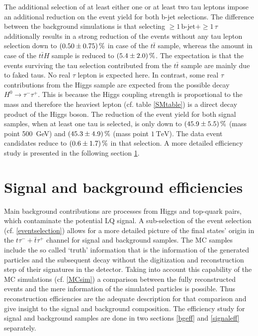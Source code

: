 %
The additional selection of at least either one or at least two tau leptons impose an additional reduction on the event yield for both b-jet selections. The difference between the background simulations is that selecting $\geq 1\,\text{b-jet}+\geq 1\,\tau$ additionally results in a strong reduction of the events without any tau lepton selection down to $\SI{0.5\pm 0.75}{\percent}$ in case of the $t\bar{t}$ sample, whereas the amount in case of the $t\bar{t}H$ sample is reduced to $\SI{5.4\pm 2.0}{\percent}$. The expectation is that the events surviving the tau selection contributed from the $t\bar{t}$ sample are mainly due to faked taus. No real $\tau$ lepton is expected here. In contrast, some real $\tau$ contributions from the Higgs sample are expected from the possible decay $H^0\rightarrow \tau^-\tau^+$. This is because the Higgs coupling strength is proportional to the mass and therefore the heaviest lepton (cf. table \ref{SMtable}) is a direct decay product of the Higgs boson. The reduction of the event yield for both signal samples, when at least one tau is selected, is only down to $\SI{45.9\pm 5.5}{\percent}$ (mass point \SI{500}{\giga\electronvolt}) and $\SI{45.3\pm 4.9}{\percent}$ (mass point $\SI{1}{\tera\electronvolt}$). The data event candidates reduce to $\SI{0.6\pm1.7}{\percent}$ in that selection. A more detailed efficiency study is presented in the following section \ref{signalANDbgEff}.     
\section{Signal and background efficiencies}\label{signalANDbgEff}
Main background contributions are processes from Higgs and top-quark pairs, which contaminate the potential LQ signal. A sub-selection of the event selection (cf. \ref{eventselection}) allows for a more detailed picture of the final states' origin in the $t\tau^{-}+\bar{t}\tau^{+}$ channel for signal and background samples. The MC samples include the so called `truth' information that is the information of the generated particles and the subsequent decay without the digitization and reconstruction step of their signatures in the detector. Taking into account this capability of the MC simulations (cf. \ref{MCsim}) a comparison between the fully reconstructed events and the mere information of the simulated particles is possible. Thus reconstruction efficiencies are the adequate description for that comparison and give insight to the signal and background composition. The efficiency study for signal and background samples are done in two sections \ref{bgeff} and \ref{signaleff} separately. 

